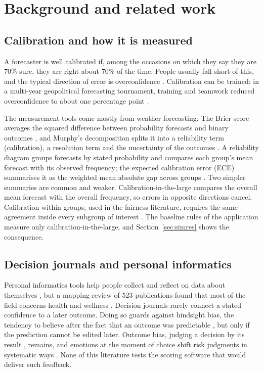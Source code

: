\documentclass[12pt,a4paper]{article}
\begin{document}
\section{Background and related work}\label{sec:related}

\subsection{Calibration and how it is measured}

A forecaster is well calibrated if, among the occasions on which they say they are 70\% sure, they are right about 70\% of the time. People usually fall short of this, and the typical direction of error is overconfidence \cite{lichtenstein1982,moore2008}. Calibration can be trained: in a multi-year geopolitical forecasting tournament, training and teamwork reduced overconfidence to about one percentage point \cite{mellers2014,moore2017}.

The measurement tools come mostly from weather forecasting. The Brier score averages the squared difference between probability forecasts and binary outcomes \cite{brier1950}, and Murphy's decomposition splits it into a reliability term (calibration), a resolution term and the uncertainty of the outcomes \cite{murphy1973}. A reliability diagram groups forecasts by stated probability and compares each group's mean forecast with its observed frequency; the expected calibration error (ECE) summarises it as the weighted mean absolute gap across groups \cite{naeini2015,guo2017}. Two simpler summaries are common and weaker. Calibration-in-the-large compares the overall mean forecast with the overall frequency, so errors in opposite directions cancel. Calibration within groups, used in the fairness literature, requires the same agreement inside every subgroup of interest \cite{kleinberg2017}. The baseline rules of the application measure only calibration-in-the-large, and Section~\ref{sec:simres} shows the consequence.

\subsection{Decision journals and personal informatics}

Personal informatics tools help people collect and reflect on data about themselves \cite{li2010}, but a mapping review of 523 publications found that most of the field concerns health and wellness \cite{epstein2020}. Decision journals rarely connect a stated confidence to a later outcome. Doing so guards against hindsight bias, the tendency to believe after the fact that an outcome was predictable \cite{fischhoff1975}, but only if the prediction cannot be edited later. Outcome bias, judging a decision by its result \cite{baron1988}, remains, and emotions at the moment of choice shift risk judgments in systematic ways \cite{lerner2015}. None of this literature tests the scoring software that would deliver such feedback.
\end{document}
